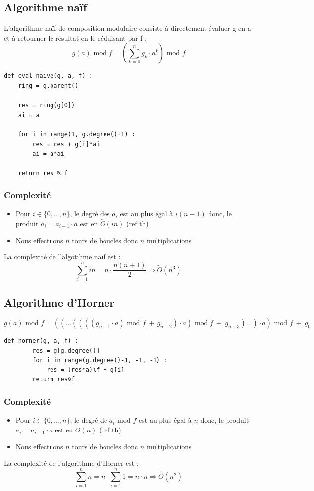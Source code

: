 \documentclass[a4paper]{article}
\begin{document}
\subsection{Algorithme naïf}

L'algorithme naïf de composition modulaire consiste à directement évaluer g en a et à retourner le résultat en le réduisant par f :
\[
g(a)\text{ mod }f = \left(\sum_{k=0}^n g_k \cdot a^k\right) \text{ mod }f    
\]

\begin{lstlisting}[title={naive}]
def eval_naive(g, a, f) :
	ring = g.parent()

	res = ring(g[0])
	ai = a
	
    for i in range(1, g.degree()+1) :
		res = res + g[i]*ai
		ai = a*ai

	return res % f
\end{lstlisting}

\subsubsection*{Complexité}
\begin{itemize}
    \item Pour $i \in \{0,...,n\}$, le degré des $a_i$ est au plus égal à $i(n-1)$ donc, le produit $a_i=a_{i-1}\cdot a$ est en $\tilde{O}(in)$ (ref th)
    \item Nous effectuons $n$ tours de boucles donc $n$ multiplications
\end{itemize}
La complexité de l'algotihme naïf est :
\[
\sum_{i=1}^{n}in=n \cdot \dfrac{n(n+1)}{2} \Longrightarrow \tilde{O}(n^3)
\]

\subsection{Algorithme d'Horner}

\[
g(a)\text{ mod }f = ((...((((g_{n-1}\cdot a)\text{ mod }f\ +\ g_{n-2})\cdot a)\text{ mod }f\ +\ g_{n-3})...)\cdot a)\text{ mod }f\ +\ g_0
\]

\begin{lstlisting}[title={Horner}]
    def horner(g, a, f) :
        res = g[g.degree()]
        for i in range(g.degree()-1, -1, -1) :
            res = (res*a)%f + g[i]
        return res%f
\end{lstlisting}

\subsubsection*{Complexité}
\begin{itemize}
    \item Pour $i \in \{0,...,n\}$, le degré de $a_i$ mod $f$ est au plus égal à $n$ donc, le produit $a_i=a_{i-1}\cdot a$ est en $\tilde{O}(n)$ (ref th)
    \item Nous effectuons $n$ tours de boucles donc $n$ multiplications
\end{itemize}
La complexité de l'algorithme d'Horner est :
\[
\sum_{i=1}^n n=n\cdot \sum_{i=1}^n 1 = n\cdot n\Longrightarrow \tilde{O}(n^2)
\]
\end{document}
